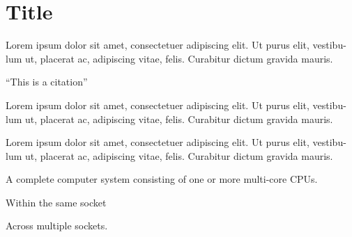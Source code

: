 



\section{Title}

Lorem ipsum dolor sit amet, consectetuer adipiscing elit. Ut purus elit, vestibu-
lum ut, placerat ac, adipiscing vitae, felis. Curabitur dictum gravida mauris.

\begin{emphasize}
  ``This is a citation''
\end{emphasize}

Lorem ipsum dolor sit amet, consectetuer adipiscing elit. Ut purus elit, vestibu-
lum ut, placerat ac, adipiscing vitae, felis. Curabitur dictum gravida mauris.


Lorem ipsum dolor sit amet, consectetuer adipiscing elit. Ut purus elit, vestibu-
lum ut, placerat ac, adipiscing vitae, felis. Curabitur dictum gravida mauris.

\begin{description}[labelsep=\linewidth]
\item[Node]
A complete computer system consisting of one or more multi-core CPUs.

\item[Intra-socket]
Within the same socket

\item[Inter-socket]
Across multiple sockets.
\end{description}


